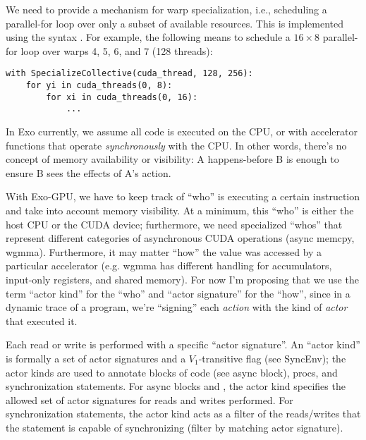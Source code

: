 \filbreak
{} We need to provide a mechanism for warp specialization, i.e., scheduling a parallel-for loop over only a subset of available resources.
This is implemented using the syntax .
For example, the following means to schedule a $16 \times 8$ parallel-for loop over warps 4, 5, 6, and 7 (128 threads):

{\color{lightttColor}
\begin{verbatim}
with SpecializeCollective(cuda_thread, 128, 256):
    for yi in cuda_threads(0, 8):
        for xi in cuda_threads(0, 16):
            ...
\end{verbatim}
}

\filbreak
{} In Exo currently, we assume all code is executed on the CPU, or with accelerator functions that operate \textit{synchronously} with the CPU.
In other words, there's no concept of memory availability or visibility: A happens-before B is enough to ensure B sees the effects of A's action.

\filbreak
With Exo-GPU, we have to keep track of ``who'' is executing a certain instruction and take into account memory visibility.
At a minimum, this ``who'' is either the host CPU or the CUDA device; furthermore, we need specialized ``whos'' that represent different categories of asynchronous CUDA operations (async memcpy, wgmma).
Furthermore, it may matter ``how'' the value was accessed by a particular accelerator (e.g. wgmma has different handling for accumulators, input-only registers, and shared memory).
For now I'm proposing that we use the term ``actor kind'' for the ``who'' and ``actor signature'' for the ``how'', since in a dynamic trace of a program, we're ``signing'' each \textit{action} with the kind of \textit{actor} that executed it.

\filbreak
Each read or write is performed with a specific ``actor signature''.
An ``actor kind'' is formally a set of actor signatures and a $V_1$-transitive flag (see SyncEnv); the actor kinds are used to annotate blocks of code (see async block),  procs, and synchronization statements.
For async blocks and , the actor kind specifies the allowed set of actor signatures for reads and writes performed.
For synchronization statements, the actor kind acts as a filter of the reads/writes that the statement is capable of synchronizing (filter by matching actor signature).

